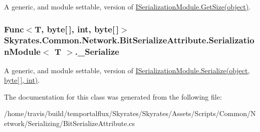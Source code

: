 A generic, and module settable, version of \hyperlink{interface_skyrates_1_1_common_1_1_network_1_1_bit_serialize_attribute_1_1_i_serialization_module_a25a42bb4dde0dda3e028c84ad010a4ad}{I\-Serialization\-Module.\-Get\-Size(object)}. 

\hypertarget{class_skyrates_1_1_common_1_1_network_1_1_bit_serialize_attribute_1_1_serialization_module_3_01_t_01_4_a89379102ea2486d5d82cc83ebf459c74}{
\subsubsection[{\-\_\-\-Serialize}]{\setlength{\rightskip}{0pt plus 5cm}Func$<$T, byte\mbox{[}$\,$\mbox{]}, int, byte\mbox{[}$\,$\mbox{]}$>$ Skyrates.\-Common.\-Network.\-Bit\-Serialize\-Attribute.\-Serialization\-Module$<$ T $>$.\-\_\-\-Serialize}}\label{class_skyrates_1_1_common_1_1_network_1_1_bit_serialize_attribute_1_1_serialization_module_3_01_t_01_4_a89379102ea2486d5d82cc83ebf459c74}


A generic, and module settable, version of \hyperlink{interface_skyrates_1_1_common_1_1_network_1_1_bit_serialize_attribute_1_1_i_serialization_module_abeca6d8c99338fc36671f58541001624}{I\-Serialization\-Module.\-Serialize(object, byte\mbox{[}$\,$\mbox{]}, int)}. 



The documentation for this class was generated from the following file\-:\begin{DoxyCompactItemize}
\item 
/home/travis/build/temportalflux/\-Skyrates/\-Skyrates/\-Assets/\-Scripts/\-Common/\-Network/\-Serializing/Bit\-Serialize\-Attribute.\-cs\end{DoxyCompactItemize}
